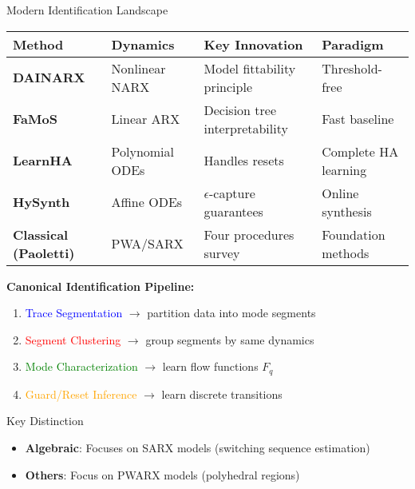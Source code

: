 \documentclass[aspectratio=169]{beamer}
\begin{document}
\begin{frame}{Modern Identification Landscape}
\begin{center}
\begin{tabular}{|l|l|l|l|}
\hline
\textbf{Method} & \textbf{Dynamics} & \textbf{Key Innovation} & \textbf{Paradigm} \\
\hline
\textbf{DAINARX} & Nonlinear NARX & Model fittability principle & Threshold-free \\
\textbf{FaMoS} & Linear ARX & Decision tree interpretability & Fast baseline \\
\textbf{LearnHA} & Polynomial ODEs & Handles resets & Complete HA learning \\
\textbf{HySynth} & Affine ODEs & $\epsilon$-capture guarantees & Online synthesis \\
\textbf{Classical (Paoletti)} & PWA/SARX & Four procedures survey & Foundation methods \\
\hline
\end{tabular}
\end{center}

\vspace{0.5cm}
\textbf{Canonical Identification Pipeline:}
\begin{enumerate}
\item \textcolor{blue}{Trace Segmentation} $\rightarrow$ partition data into mode segments
\item \textcolor{red}{Segment Clustering} $\rightarrow$ group segments by same dynamics
\item \textcolor{green}{Mode Characterization} $\rightarrow$ learn flow functions $F_q$
\item \textcolor{orange}{Guard/Reset Inference} $\rightarrow$ learn discrete transitions
\end{enumerate}

\begin{block}{Key Distinction}
\begin{itemize}
\item \textbf{Algebraic}: Focuses on SARX models (switching sequence estimation)
\item \textbf{Others}: Focus on PWARX models (polyhedral regions)
\end{itemize}
\end{block}
\end{frame}
\end{document}
